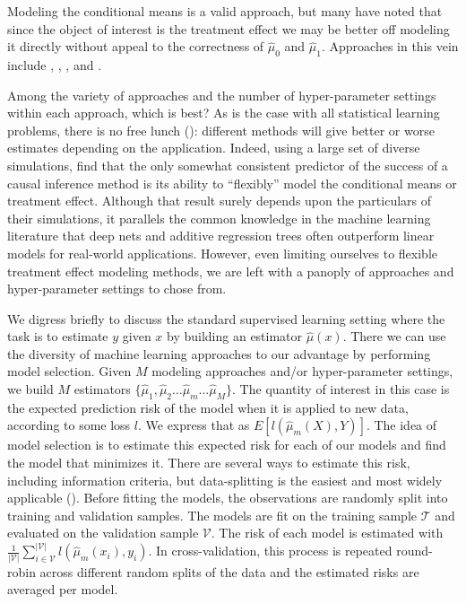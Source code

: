 Modeling the conditional means is a valid approach, but many have noted that since the object of interest is the treatment effect we may be better off modeling it directly without appeal to the correctness of $\hat\mu_0$ and $\hat\mu_1$. Approaches in this vein include \citet{Zhao:2017vi}, \citet{Athey:2016wm}, \citet{Powers:2017wd}, and \citet{Nie:2017vi}. 

Among the variety of approaches and the number of hyper-parameter settings within each approach, which is best? As is the case with all statistical learning problems, there is no free lunch (\citealp{Wolpert:1996fp}): different methods will give better or worse estimates depending on the application. Indeed, using a large set of diverse simulations, \citet{Dorie:2017uo} find that the only somewhat consistent predictor of the success of a causal inference method is its ability to ``flexibly'' model the conditional means or treatment effect. Although that result surely depends upon the particulars of their simulations, it parallels the common knowledge in the machine learning literature that deep nets and additive regression trees often outperform linear models for real-world applications. However, even limiting ourselves to flexible treatment effect modeling methods, we are left with a panoply of approaches and hyper-parameter settings to chose from. 

We digress briefly to discuss the standard supervised learning setting where the task is to estimate $y$ given $x$ by building an estimator $\hat{\mu}(x)$. There we can use the diversity of machine learning approaches to our advantage by performing model selection. Given $M$ modeling approaches and/or hyper-parameter settings, we build $M$ estimators $\{\hat \mu_1, \hat \mu_2 \dots \hat \mu_m \dots \hat \mu_M\}$. The quantity of interest in this case is the expected prediction risk of the model when it is applied to new data, according to some loss $l$. We express that as $E[l(\hat \mu_m(X), Y)]$. The idea of model selection is to estimate this expected risk for each of our models and find the model that minimizes it. There are several ways to estimate this risk, including information criteria, but data-splitting is the easiest and most widely applicable (\citealp{esl:2009wc, Arlot:2010fl, Dudoit:2005jw}). Before fitting the models, the observations are randomly split into training and validation samples. The models are fit on the training sample $\mathcal{T}$ and evaluated on the validation sample $\mathcal{V}$. The risk of each model is estimated with $\frac{1}{|\mathcal{V}|}\sum_{i \in \mathcal{V}}^{|\mathcal{V}|} l(\hat \mu_m (x_i), y_i)$. In cross-validation, this process is repeated round-robin across different random splits of the data and the estimated risks are averaged per model.

